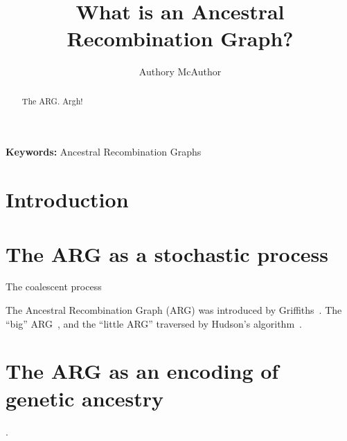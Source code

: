 \documentclass{article}
\begin{document}
\linenumbers
\title{What is an Ancestral Recombination Graph?}
\author{Authory McAuthor}

\maketitle

\begin{abstract}
The ARG. Argh!
\end{abstract}

\textbf{Keywords:} Ancestral Recombination Graphs

\section*{Introduction}


\section*{The ARG as a stochastic process}
The coalescent
process~\citep{kingman1982coalescent,kingman1982genealogy,hudson1983testing,
tajima1983evolutionary}

The Ancestral Recombination Graph (ARG) was introduced by
Griffiths~\citep{griffiths1991two,griffiths1997ancestral}.
The ``big'' ARG~\citep{ethier1990two},
and the ``little ARG'' traversed by
Hudson's algorithm~\citep{hudson1983properties}.

\section*{The ARG as an encoding of genetic ancestry}

\citep[e.g.][]{minichiello2006mapping,mathieson2020ancestry}.




\end{document}
